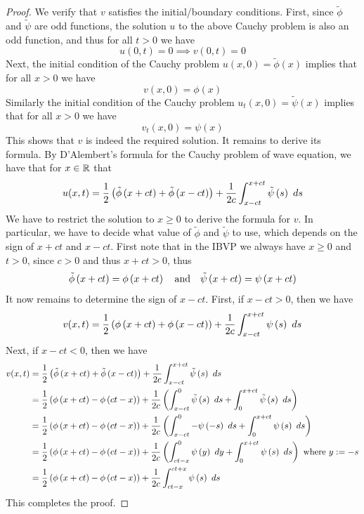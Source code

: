 \begin{proof}
    We verify that $v$ satisfies the initial/boundary conditions. First, since $\tilde{\phi}$ and $\tilde{\psi}$ are odd functions, the solution $u$ to the above Cauchy problem is also an odd function, and thus for all $t > 0$ we have 
    \[u(0,t) = 0\implies v(0,t) = 0\]
    Next, the initial condition of the Cauchy problem $u(x,0) = \tilde{\phi}(x)$ implies that for all $x > 0$ we have
    \[v(x,0)=\phi(x)\]
    Similarly the initial condition of the Cauchy problem $u_t(x,0) = \tilde{\psi}(x)$ implies that for all $x > 0$ we have
    \[v_t(x,0) = \psi(x)\]
    This shows that $v$ is indeed the required solution. It remains to derive its formula. By D'Alembert's formula for the Cauchy problem of wave equation, we have that for $x\in {\mathbb R}$ that
    \[u(x,t) = \frac{1}{2}\left(\tilde\phi \left(x+ct\right) + \tilde\phi \left(x-ct\right)\right) + \frac{1}{2c} \int_{x-ct}^{x+ct}\tilde\psi \left(s\right)\ ds\]
    We have to restrict the solution to $x\geq 0$ to derive the formula for $v$. In particular, we have to decide what value of $\tilde\phi$ and $\tilde\psi$ to use, which depends on the sign of $x+ct$ and $x-ct$. First note that in the IBVP we always have $x\geq0$ and $t>0$, since $c> 0$ and thus $x+ct> 0$, thus
    \[\tilde\phi \left(x+ct\right) = \phi \left(x+ct\right) \quad \text{and} \quad \tilde\psi \left(x+ct\right) = \psi \left(x+ct\right)\]
    It now remains to determine the sign of $x-ct$. First, if $x-ct > 0$, then we have 
    \[v(x,t) = \frac{1}{2}\left(\phi \left(x+ct\right) + \phi \left(x-ct\right)\right) + \frac{1}{2c} \int_{x-ct}^{x+ct}\psi \left(s\right)\ ds\]
    Next, if $x-ct < 0$, then we have
    \begin{align*}
        v(x,t) &= \frac{1}{2}\left(\tilde\phi \left(x+ct\right) + \tilde\phi \left(x-ct\right)\right) + \frac{1}{2c} \int_{x-ct}^{x+ct}\tilde\psi \left(s\right)\ ds\ \\
        &= \frac{1}{2}\left(\phi \left(x+ct\right) - \phi \left(ct-x\right)\right) + \frac{1}{2c} \left(\int_{x-ct}^{0}\tilde\psi \left(s\right)\ ds + \int_{0}^{x+ct}\tilde\psi \left(s\right)\ ds\right) \\
        &=  \frac{1}{2}\left(\phi \left(x+ct\right) - \phi \left(ct-x\right)\right) + \frac{1}{2c} \left(\int_{x-ct}^{0}-\psi \left(-s\right)\ ds + \int_{0}^{x+ct}\psi \left(s\right)\ ds\right) \\
        &= \frac{1}{2}\left(\phi \left(x+ct\right) - \phi \left(ct-x\right)\right) + \frac{1}{2c} \left(\int_{ct-x}^{0}\psi \left(y\right)\ dy + \int_{0}^{x+ct}\psi \left(s\right)\ ds\right)\ \text{where } y := -s\\
        &= \frac{1}{2}\left(\phi \left(x+ct\right) - \phi \left(ct-x\right)\right) + \frac{1}{2c} \int_{ct-x}^{ct+x}\psi \left(s\right)\ ds
    \end{align*}
    This completes the proof.
\end{proof}

